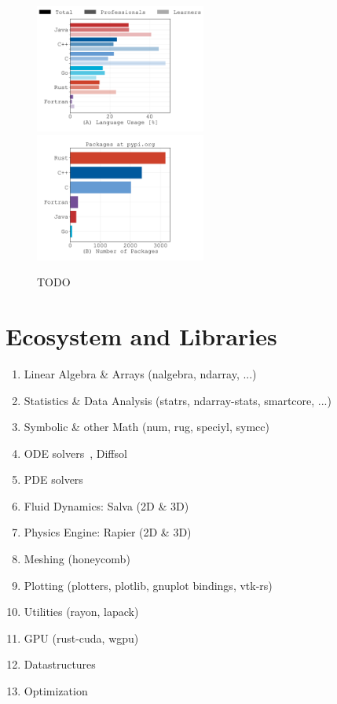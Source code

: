 \documentclass{article}
\begin{document}
\begin{figure}
    \centering
    \includegraphics[width=0.5\textwidth]{figures/stackoverflow-popular-languages.pdf}%
    \includegraphics[width=0.5\textwidth]{figures/pypi-org-used-languages.pdf}
    \caption{TODO}
\end{figure}

\section{Ecosystem and Libraries}

\begin{enumerate}
    \item Linear Algebra \& Arrays (nalgebra, ndarray, ...)
    \item Statistics \& Data Analysis (statrs, ndarray-stats, smartcore, ...)
    \item Symbolic \& other Math (num, rug, speciyl, symcc)
    \item ODE solvers~\cite{Renevey2024}, Diffsol
    \item PDE solvers
    \item Fluid Dynamics: Salva (2D \& 3D)~\cite{Crozet2024}
    \item Physics Engine: Rapier (2D \& 3D)~\cite{Crozet2025}
    \item Meshing (honeycomb)
    \item Plotting (plotters, plotlib, gnuplot bindings, vtk-rs)
    \item Utilities (rayon, lapack)
    \item GPU (rust-cuda, wgpu)
    \item Datastructures
    \item Optimization
\end{enumerate}
\end{document}
